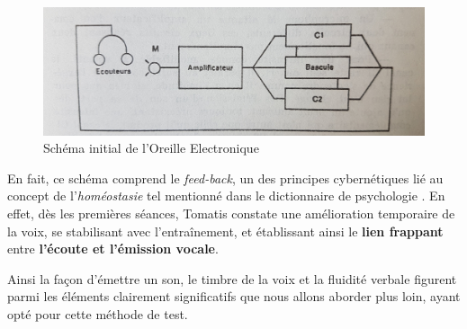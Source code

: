 \begin{figure}
	\centering
	\includegraphics[width=0.7\linewidth]{images/oreilleelectro.jpg}
	\caption[oreilleelectro]{Schéma initial de l'Oreille
          Electronique}
       
	\label{oreilleelectro}
\end{figure}
En fait, ce schéma comprend le\textit{ feed-back}, un des principes
cybernétiques lié au concept de l'\textit{homéostasie} tel
mentionné dans le dictionnaire de
psychologie \autocite[298]{doronparot}.
En effet, dès les premières
séances, Tomatis constate une amélioration temporaire de la voix, se
stabilisant avec l'entraînement, et établissant ainsi le
\textbf{lien frappant} entre\textbf{ l'écoute et
  l'émission vocale}.

Ainsi la façon d'émettre un son, le timbre de la voix et la fluidité
verbale figurent parmi les
éléments clairement significatifs que nous allons aborder plus loin, ayant opté pour
cette méthode de test.
